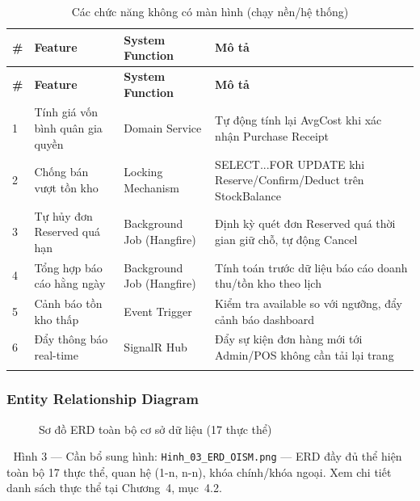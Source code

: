 \begin{longtable}{|p{0.6cm}|p{4cm}|p{2.8cm}|p{6cm}|}
    \hline
    \textbf{\#} & \textbf{Feature} & \textbf{System Function} & \textbf{Mô tả} \\
    \hline
    \endfirsthead
    \hline
    \textbf{\#} & \textbf{Feature} & \textbf{System Function} & \textbf{Mô tả} \\
    \hline
    \endhead
    1 & Tính giá vốn bình quân gia quyền & Domain Service & Tự động tính lại AvgCost khi xác nhận Purchase Receipt \\
    \hline
    2 & Chống bán vượt tồn kho & Locking Mechanism & SELECT...FOR UPDATE khi Reserve/Confirm/Deduct trên StockBalance \\
    \hline
    3 & Tự hủy đơn Reserved quá hạn & Background Job (Hangfire) & Định kỳ quét đơn Reserved quá thời gian giữ chỗ, tự động Cancel \\
    \hline
    4 & Tổng hợp báo cáo hằng ngày & Background Job (Hangfire) & Tính toán trước dữ liệu báo cáo doanh thu/tồn kho theo lịch \\
    \hline
    5 & Cảnh báo tồn kho thấp & Event Trigger & Kiểm tra available so với ngưỡng, đẩy cảnh báo dashboard \\
    \hline
    6 & Đẩy thông báo real-time & SignalR Hub & Đẩy sự kiện đơn hàng mới tới Admin/POS không cần tải lại trang \\
    \hline
    \caption{Các chức năng không có màn hình (chạy nền/hệ thống)}
    \label{tab:non-screen-functions}
\end{longtable}

\subsubsection{Entity Relationship Diagram}

\begin{figure}[H]
    \centering
    \caption{Sơ đồ ERD toàn bộ cơ sở dữ liệu (17 thực thể)}
    \label{fig:erd-conceptual}
\end{figure}
\begin{imgnote}
📌 Hình 3 — Cần bổ sung hình: \texttt{Hinh\_03\_ERD\_OISM.png} — ERD đầy đủ thể hiện toàn bộ 17 thực thể, quan hệ (1-n, n-n), khóa chính/khóa ngoại. Xem chi tiết danh sách thực thể tại Chương~4, mục~4.2.
\end{imgnote}

